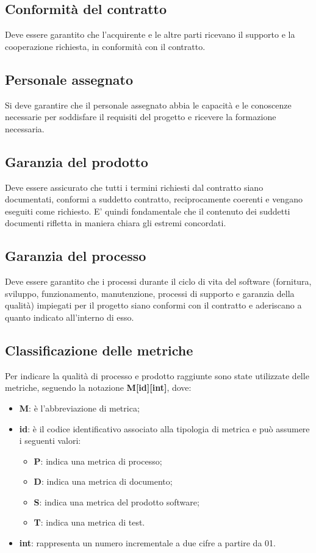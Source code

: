 \documentclass[]{article}
\begin{document}
					\subsection{Conformità del contratto}
					Deve essere garantito che l'acquirente e le altre parti ricevano il supporto e la
					cooperazione richiesta, in conformità con il contratto.					
					
					\subsection{Personale assegnato}
					Si deve garantire che il personale assegnato abbia le capacità e le conoscenze necessarie per soddisfare il requisiti del progetto e ricevere la formazione necessaria.
					
					\subsection{Garanzia del prodotto}
					Deve essere assicurato che tutti i termini richiesti dal contratto siano documentati, conformi a
					suddetto contratto, reciprocamente coerenti e vengano eseguiti come richiesto. E' quindi fondamentale che il contenuto dei suddetti documenti rifletta in maniera chiara gli estremi concordati. 				
					
					\subsection{Garanzia del processo}
					Deve essere garantito che i processi durante il ciclo di vita del software (fornitura, sviluppo, funzionamento, manutenzione, processi di supporto e garanzia della qualità) impiegati per il progetto siano conformi con il contratto e aderiscano a quanto indicato all'interno di esso.
					
					\subsection{Classificazione delle metriche}
					Per indicare la qualità di processo e prodotto raggiunte sono state utilizzate delle metriche, seguendo la notazione \textbf{M[id][int]}, dove:
					\begin{itemize}					
						\item \textbf{M}: è l’abbreviazione di metrica;
						\item \textbf{id}: è il codice identificativo associato alla tipologia di metrica e può assumere i seguenti valori:
						\begin{itemize}
							\item \textbf{P}: indica una metrica di processo;
							\item \textbf{D}: indica una metrica di documento;
							\item \textbf{S}: indica una metrica del prodotto software;
							\item \textbf{T}: indica una metrica di test.
						\end{itemize}
						\item \textbf{int}: rappresenta un numero incrementale a due cifre a partire da 01.
					\end{itemize}
					
\end{document}
